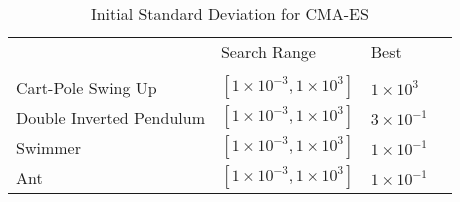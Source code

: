 \documentclass{article}
\begin{document}
\begin{table}[!t]
\centering
\caption{Initial Standard Deviation for CMA-ES}
\label{hyper_cma_es}
\begin{tabular}{l|lll}
\cline{1-4} \\ [-8pt]
 & Search Range              & Best                 &  \\ [2pt] \cline{1-4} \\ [-8pt]
Cart-Pole Swing Up     & $[1\times 10^{-3}, 1\times 10^3]$            & $1 \times 10^{3}$               &  \\
Double Inverted Pendulum     & $[1\times 10^{-3}, 1\times 10^3]$     & $3 \times 10^{-1}$               &  \\
Swimmer               & $[1\times 10^{-3}, 1\times 10^3]$            & $1 \times 10^{-1}$               &  \\
Ant                   & $[1\times 10^{-3}, 1\times 10^3]$               & $1 \times 10^{-1}$               &  \\ [2pt] \cline{1-4}
\end{tabular}
\end{table}
\clearpage{}
\end{document}
